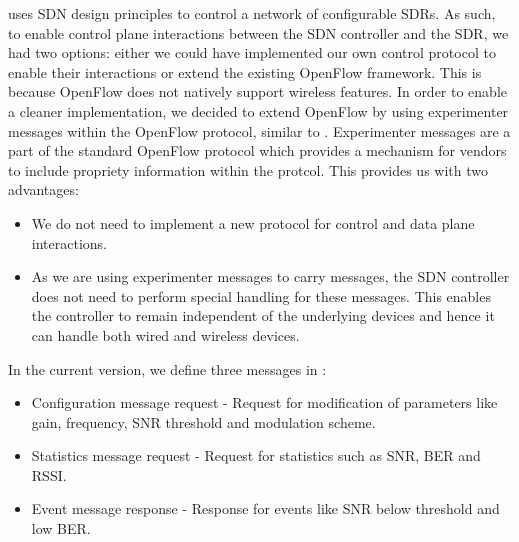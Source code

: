 \crossflow uses SDN design principles to control a network of configurable SDRs. As such, to enable control plane interactions between the SDN controller and the SDR, we had two options: either we could have implemented our own control protocol to enable their interactions or extend the existing OpenFlow \cite{openflow} framework. This is because OpenFlow does not natively support wireless features. In order to enable a cleaner implementation, we decided to extend OpenFlow by using experimenter messages within the OpenFlow protocol, similar to \aetherflow. Experimenter messages are a part of the standard OpenFlow protocol which provides a mechanism for vendors to include propriety information within the protcol. This provides us with two advantages:
\begin{itemize}
\item We do not need to implement a new protocol for control and data plane interactions.
\item As we are using experimenter messages to carry \crossflow messages, the SDN controller does not need to perform special handling for these messages. This enables the controller to remain independent of the underlying devices and hence it can handle both wired and wireless devices. 
\end{itemize} 
In the current version, we define three messages in \crossflow:
\begin{itemize}
\item Configuration message request - Request for modification of parameters like gain, frequency, SNR threshold and modulation scheme.
\item Statistics message request - Request for statistics such as SNR, BER and RSSI.
\item Event message response - Response for events like SNR below threshold and low BER.
\end {itemize}
